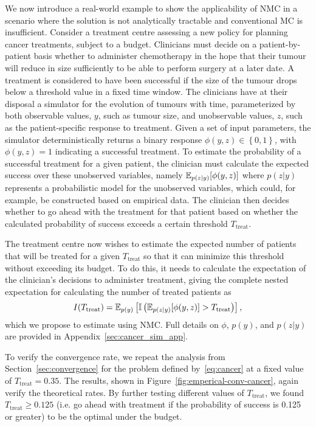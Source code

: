 We now introduce a real-world example to show the applicability of NMC in a scenario
where the solution is not analytically tractable and conventional MC is insufficient.
Consider a treatment centre assessing a new policy for planning cancer treatments, subject to a budget. 
Clinicians must decide on a patient-by-patient basis whether to administer chemotherapy in the
hope that their tumour will reduce in size sufficiently to be able to perform surgery at a later date.
A treatment is considered to have been successful if the size of the tumour drops below a threshold value in a fixed time window.
The clinicians have at their disposal a simulator for the evolution of tumours with time,
parameterized by both observable values, $y$, such as tumour size, and unobservable values, $z$, such as the patient-specific response to treatment.
Given a set of input parameters, the simulator deterministically returns a binary response $\phi(y,z)\in\left\lbrace 0,1\right\rbrace $, with $\phi(y,z) = 1$ indicating a successful treatment.
To estimate the probability of a successful treatment for a given patient, the clinician must calculate the expected
success over these unobserved variables, namely $\mathbb{E}_{p(z|y)} [\phi(y,z)]$ where $p(z|y)$ represents a probabilistic
model for the unobserved variables, which could, for example, be constructed based on empirical data.
The clinician then decides whether to go ahead with the treatment for that
patient based on whether the calculated probability of success exceeds a certain threshold $T_{\mathrm{treat}}$.

The treatment centre now wishes to estimate the expected number of patients that will be treated for a given $T_{\mathrm{treat}}$ so that it can minimize this threshold without exceeding its budget.
To do this, it needs to calculate the expectation of the clinician's decisions to administer 
treatment, giving the complete nested expectation for calculating the number of treated patients as
\begin{equation}
	\label{eq:cancer}
I(T_{\mathrm{treat}}) = \mathbb{E}_{p(y)} \left[\mathbb{I}\left(\mathbb{E}_{p(z|y)} [\phi(y,z)]>T_{\mathrm{treat}}\right)\right],
\end{equation}
which we propose to estimate using NMC.  Full details on $\phi$, $p(y)$, and $p(z|y)$ are 
provided in Appendix~\ref{sec:cancer_sim_app}.

To verify the convergence rate, we repeat the analysis from Section~\ref{sec:convergence} for the problem defined by~\eqref{eq:cancer} at a fixed value of $T_{\mathrm{treat}}=0.35$. 
The results, shown in Figure~\ref{fig:emperical-conv-cancer}, again verify the theoretical rates. 
By further testing different values of $T_{\mathrm{treat}}$, we found $T_{\mathrm{treat}} \ge 0.125$ (i.e.
go ahead with treatment if the probability of success is 0.125 or greater) to be the optimal under the budget.

